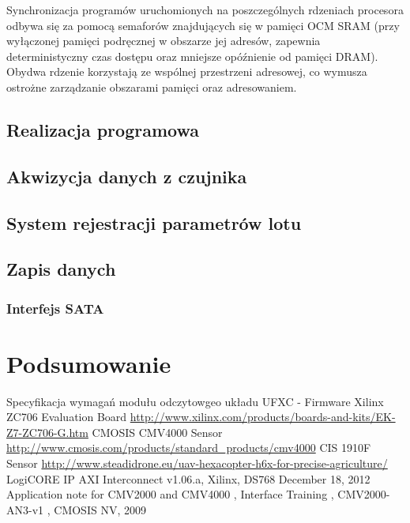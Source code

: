 \documentclass[a4paper,11pt,oneside]{book}  %
\begin{document}
Synchronizacja programów uruchomionych na poszczególnych rdzeniach procesora odbywa się za pomocą semaforów znajdujących się w pamięci OCM SRAM (przy wyłączonej pamięci podręcznej w obszarze jej adresów, zapewnia deterministyczny czas dostępu oraz mniejsze opóźnienie od pamięci DRAM). Obydwa rdzenie korzystają ze wspólnej przestrzeni adresowej, co wymusza ostrożne zarządzanie obszarami pamięci oraz adresowaniem.

\section{Realizacja programowa}



\section{Akwizycja danych z czujnika}

\section{System rejestracji parametrów lotu}

\section{Zapis danych}

\subsection{Interfejs SATA}



\chapter{Podsumowanie}





\begin{thebibliography}{9}
 Specyfikacja wymagań modułu odczytowgeo układu UFXC - Firmware
 Xilinx ZC706 Evaluation Board \url{http://www.xilinx.com/products/boards-and-kits/EK-Z7-ZC706-G.htm}
 CMOSIS CMV4000 Sensor \url{http://www.cmosis.com/products/standard_products/cmv4000}
 CIS 1910F Sensor
 \url{http://www.steadidrone.eu/uav-hexacopter-h6x-for-precise-agriculture/}
  LogiCORE IP AXI Interconnect v1.06.a, Xilinx, DS768 December 18, 2012
 Application note for CMV2000 and CMV4000 , Interface Training , CMV2000-AN3-v1 , CMOSIS NV, 2009
\end{thebibliography}
\end{document}
